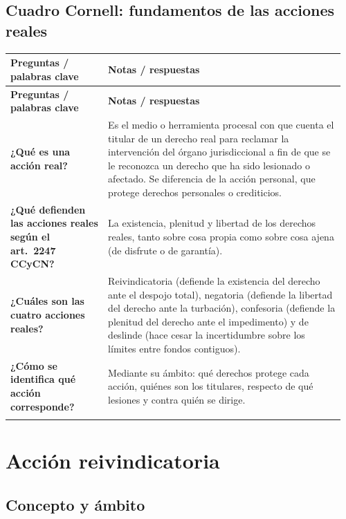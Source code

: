 \documentclass[12pt,oneside]{book}
\makeatletter
\newenvironment{cornell}{%
    \par\vspace{0.5em}
    \begin{longtable}{@{}>{\RaggedRight\arraybackslash}p{0.28\linewidth}
                         >{\RaggedRight\arraybackslash}p{0.68\linewidth}@{}}
    \toprule
    \textbf{Preguntas / palabras clave} & \textbf{Notas / respuestas} \\
    \midrule
    \endfirsthead
    \toprule
    \textbf{Preguntas / palabras clave} & \textbf{Notas / respuestas} \\
    \midrule
    \endhead
}{%
    \bottomrule
    \end{longtable}
}
\newcommand{\cornellsummary}[1]{%
    \midrule
    \multicolumn{2}{@{}p{\dimexpr0.96\linewidth+2\tabcolsep\relax}@{}}{%
        \textbf{Resumen:} #1} \\
}
\makeatother
\begin{document}
\section{Cuadro Cornell: fundamentos de las acciones reales}

\begin{cornell}
\textbf{¿Qué es una acción real?} &
Es el medio o herramienta procesal con que cuenta el titular de un derecho real para reclamar la intervención del órgano jurisdiccional a fin de que se le reconozca un derecho que ha sido lesionado o afectado. Se diferencia de la acción personal, que protege derechos personales o crediticios. \\[0.6em]

\textbf{¿Qué defienden las acciones reales según el art.\ 2247 CCyCN?} &
La existencia, plenitud y libertad de los derechos reales, tanto sobre cosa propia como sobre cosa ajena (de disfrute o de garantía). \\[0.6em]

\textbf{¿Cuáles son las cuatro acciones reales?} &
Reivindicatoria (defiende la existencia del derecho ante el despojo total), negatoria (defiende la libertad del derecho ante la turbación), confesoria (defiende la plenitud del derecho ante el impedimento) y de deslinde (hace cesar la incertidumbre sobre los límites entre fondos contiguos). \\[0.6em]

\textbf{¿Cómo se identifica qué acción corresponde?} &
Mediante su ámbito: qué derechos protege cada acción, quiénes son los titulares, respecto de qué lesiones y contra quién se dirige. \\

\cornellsummary{Las acciones reales son los medios procesales para defender en juicio la existencia, plenitud y libertad de los derechos reales (art.\ 2247 CCyCN). Cada una de las cuatro acciones tiene un ámbito propio, definido por el derecho protegido, el tipo de lesión y el objeto de la sentencia.}
\end{cornell}

\chapter{Acción reivindicatoria}

\section{Concepto y ámbito}
\end{document}
